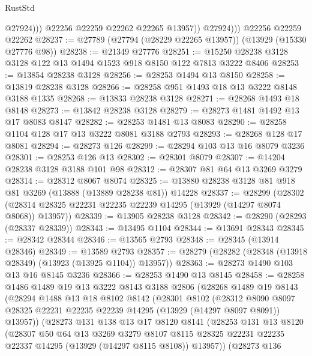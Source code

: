 \begin{lexlean}{RustStd}
\begin{coremodule}
                    @27924)))
              @22256
              @22259
              @22262
              @22265
              @13957))
          @27924)))
    @22256
    @22259
    @22262
@28237 := @27789 (@27794 (@28229 @22265 @13957)) (@13929 (@15330 @27776 @98))
@28238 := @21349 @27776
@28251 := @15250 @28238 @3128 @3128 @122 @13 @1494 @1523 @918 @8150 @122 @7813 @3222 @8406
@28253 := @13854 @28238 @3128
@28256 := @28253 @1494 @13 @8150
@28258 := @13819 @28238 @3128
@28266 := @28258 @951 @1493 @18 @13 @3222 @8148 @3188 @1335
@28268 := @13833 @28238 @3128
@28271 := @28268 @1493 @18 @8148
@28273 := @13842 @28238 @3128
@28279 := @28273 @1481 @1492 @13 @17 @8083 @8147
@28282 := @28253 @1481 @13 @8083
@28290 := @28258 @1104 @128 @17 @13 @3222 @8081 @3188 @2793
@28293 := @28268 @128 @17 @8081
@28294 := @28273 @126
@28299 := @28294 @103 @13 @16 @8079 @3236
@28301 := @28253 @126 @13
@28302 := @28301 @8079
@28307 := @14204 @28238 @3128 @3188 @101 @98
@28312 := @28307 @81 @64 @13 @3269 @3279
@28314 := @28312 @8067 @8074
@28325 := @13880 @28238 @3128 @81 @918 @81 @3269 (@13888 (@13889 @28238 @81)) @14228
@28337 := @28299
    (@28302 (@28314 @28325 @22231 @22235 @22239 @14295 (@13929 (@14297 @8074 @8068)) @13957))
@28339 := @13905 @28238 @3128
@28342 := @28290 (@28293 (@28337 @28339))
@28343 := @13495 @1104
@28344 := @13691 @28343
@28345 := @28342 @28344
@28346 := @13565 @2793
@28348 := @28345 (@13914 @28346)
@28349 := @13589 @2793
@28357 := @28279 (@28282 (@28348 (@13918 @28349) (@13923 (@13925 @1104)) @13957))
@28363 := @28273 @1490 @103 @13 @16 @8145 @3236
@28366 := @28253 @1490 @13 @8145
@28458 := @28258
    @1486
    @1489
    @19
    @13
    @3222
    @8143
    @3188
    @2806
    (@28268
      @1489
      @19
      @8143
      (@28294
        @1488
        @13
        @18
        @8102
        @8142
        (@28301
          @8102
          (@28312
            @8090
            @8097
            @28325
            @22231
            @22235
            @22239
            @14295
            (@13929 (@14297 @8097 @8091))
            @13957))
        (@28273
          @131
          @138
          @13
          @17
          @8120
          @8141
          (@28253
            @131
            @13
            @8120
            (@28307
              @50
              @64
              @13
              @3269
              @3279
              @8107
              @8115
              @28325
              @22231
              @22235
              @22337
              @14295
              (@13929 (@14297 @8115 @8108))
              @13957))
          (@28273
            @136

\end{coremodule}
\end{lexlean}
